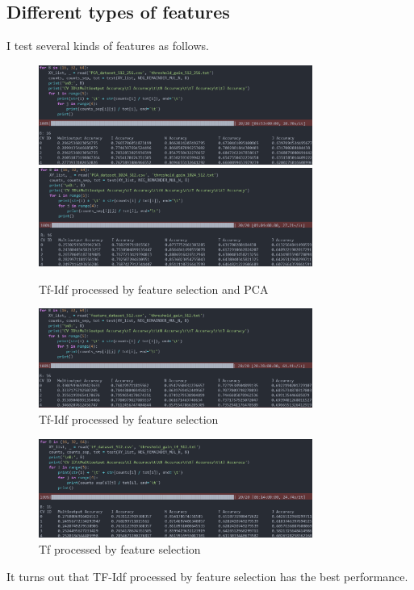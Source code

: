 \documentclass[UTF8, a4paper, 11pt]{article}
\begin{document}
\subsection{Different types of features}
I test several kinds of features as follows.
\begin{figure}[H]
    \centering
    \includegraphics[width=0.8\textwidth]{512_256_16_gain.png}
    \includegraphics[width=0.8\textwidth]{1024_512_16_gain.png}
    \caption{Tf-Idf processed by feature selection and PCA}
\end{figure}
\begin{figure}[H]
    \centering
    \includegraphics[width=0.8\textwidth]{512_16_gain.png}
    \caption{Tf-Idf processed by feature selection}
\end{figure}
\begin{figure}[H]
    \centering
    \includegraphics[width=0.8\textwidth]{tf_512_16_gain.png}
    \caption{Tf processed by feature selection}
\end{figure}
It turns out that TF-Idf processed by feature selection has the best performance.
\end{document}
